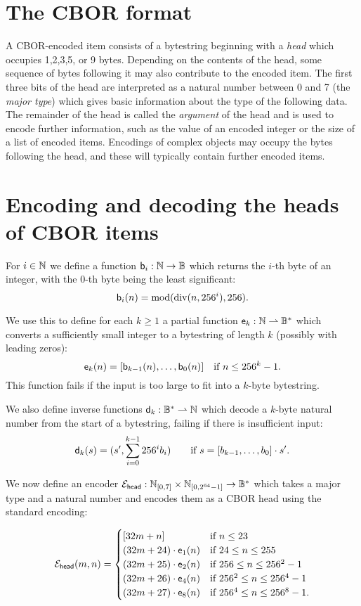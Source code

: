 \section{The CBOR format}
A CBOR-encoded item consists of a bytestring beginning with a \textit{head}
which occupies 1,2,3,5, or 9 bytes.  Depending on the contents of the head, some
sequence of bytes following it may also contribute to the encoded item. The
first three bits of the head are interpreted as a natural number between 0 and 7
(the \textit{major type}) which gives basic information about the type of the
following data.  The remainder of the head is called the \textit{argument} of the
head and is used to encode further information, such as the value of an encoded
integer or the size of a list of encoded items.  Encodings of complex objects
may occupy the bytes following the head, and these will typically contain
further encoded items.

\section{Encoding and decoding the heads of CBOR items}
For $i \in \mathbb{N}$ we define a function $\mathsf{b}_i: \mathbb{N} \rightarrow \mathbb{B}$ which returns
the $i$-th byte of an integer, with the 0-th byte being the least significant:
$$
  \mathsf{b}_i(n) = \operatorname{mod}(\operatorname{div}(n,256^i), 256).
$$

\noindent We use this to define for each $k \geq 1$ a partial function
$\mathsf{e}_k: \mathbb{N} \rightharpoonup \mathbb{B}^*$ which converts a sufficiently small
integer to a bytestring of length $k$ (possibly with leading zeros):
$$
\mathsf{e}_k(n) = [\mathsf{b}_{k-1}(n), \ldots, \mathsf{b}_0(n)]  \quad \text {if $n \leq 256^k-1$}.
$$
\noindent
This function fails if the input is too large to fit into a $k$-byte
bytestring.

We also define inverse functions $\mathsf{d}_k: \mathbb{B}^* \rightharpoonup \mathbb{N}$ which
decode a $k$-byte natural number from the start of a bytestring, failing if
there is insufficient input:
$$ \mathsf{d}_k(s) = (s', \sum_{i=0}^{k-1}256^ib_i) \qquad \text{if $s = [b_{k-1},
    \ldots, b_0] \cdot s'$}.
$$
 
\noindent We now define an encoder $\mathcal{E}_{\mathsf{head}}: \mathbb{N}_{[0,7]} \times
\mathbb{N}_{[0,2^{64}-1]} \rightarrow \mathbb{B}^*$ which takes a major type and a
natural number and encodes them as a CBOR head using the standard encoding:

$$
  \mathcal{E}_{\mathsf{head}}(m,n) =
  \begin{cases}
    [32m + n] & \text{if $n \leq 23$}\\
    (32m+24) \cdot \mathsf{e}_1(n) & \text{if $24 \leq n \leq 255$}\\
    (32m+25) \cdot \mathsf{e}_2(n) & \text{if $256 \leq n \leq 256^2-1$}\\
    (32m+26) \cdot \mathsf{e}_4(n)& \text{if $256^2 \leq n \leq 256^4-1$}\\
    (32m+27) \cdot \mathsf{e}_8(n) & \text{if $256^4 \leq n \leq 256^8-1$}.
  \end{cases}
$$

